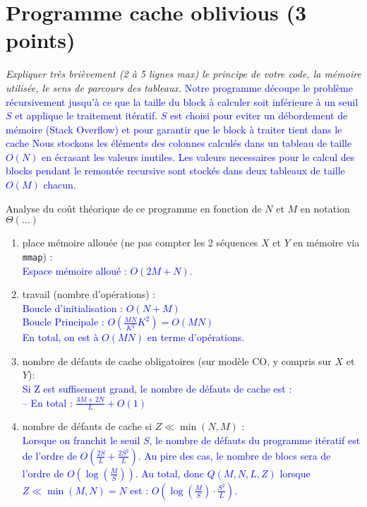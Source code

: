 \documentclass[10pt,a4paper]{article}
\begin{document}
\section{Programme cache oblivious  (3 points)}
{\em Expliquer très brièvement (2 à 5 lignes max) le principe de votre code, la mémoire utilisée, le sens de parcours des tableaux.}
\textcolor{blue}{Notre programme découpe le problème récursivement jusqu'à ce que la taille du block à calculer soit inférieure à un seuil $S$ et applique le traitement itératif. $S$ est choisi pour eviter un débordement de mémoire (Stack Overflow) et pour garantir que le block à traiter tient dans le cache
Nous stockons les éléments des colonnes calculés dans un tableau de taille $O(N)$ en écrasant les valeurs inutiles. Les valeurs necessaires pour le calcul des blocks pendant le remontée recursive sont stockés dans deux tableaux de taille $O(M)$ chacun.
}


Analyse du coût théorique de ce  programme en fonction de $N$ et $M$  en notation $\Theta(...)$
\begin{enumerate}
  \item place mémoire allouée (ne pas compter les 2 séquences $X$ et $Y$ en mémoire via {\tt mmap}) : \\
  \textcolor{blue}{
    Espace mémoire alloué : $O(2M + N)$.
  }
  \item travail (nombre d'opérations) : \\
  \textcolor{blue}{
    Boucle d'initialisation : $O(N + M)$ \\
    Boucle Principale       : $O(\frac{MN}{K^{2}} K^{2}) = O(MN)$  \\
    En total, on est à $O(MN)$ en terme d'opérations.
  }
  \item nombre de défauts de cache obligatoires (sur modèle CO, y compris sur $X$ et $Y$): \\
  \textcolor{blue}{
    Si Z est suffisement grand, le nombre de défauts de cache est : \\
    -- En total :  $ \frac{3M + 2N}{L} + O(1)$
  }
  \item nombre de défauts de cache si $Z \ll \min(N,M)$ : \\
  \textcolor{blue}{
  	Lorsque on franchit le seuil \(S\), le nombre de défauts du programme itératif est de l'ordre de $O\left(\frac{2S}{L} + \frac{2S^2}{L}\right)$. Au pire des cas, le nombre de blocs sera de l'ordre de $O\left(\log\left(\frac{M}{S}\right)\right)$.
  	Au total, donc $Q(M, N, L, Z)$ lorsque $Z \ll \min(M, N) = N$ est : $O\left(\log\left(\frac{M}{S}\right) \cdot \frac{S^2}{L}\right)$.
    }
\end{enumerate}
\end{document}
